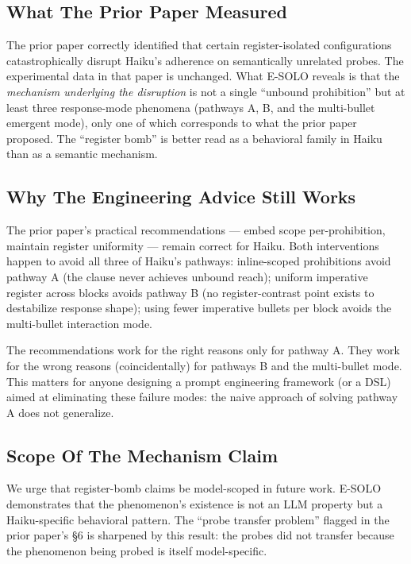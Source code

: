 \documentclass[11pt,a4paper]{article}
\begin{document}
\subsection{What The Prior Paper Measured}

The prior paper correctly identified that certain register-isolated
configurations catastrophically disrupt Haiku's adherence on
semantically unrelated probes. The experimental data in that paper
is unchanged. What E-SOLO reveals is that the \emph{mechanism
underlying the disruption} is not a single ``unbound prohibition''
but at least three response-mode phenomena (pathways A, B, and the
multi-bullet emergent mode), only one of which corresponds to what
the prior paper proposed. The ``register bomb'' is better read as
a behavioral family in Haiku than as a semantic mechanism.

\subsection{Why The Engineering Advice Still Works}

The prior paper's practical recommendations --- embed scope
per-prohibition, maintain register uniformity --- remain correct
for Haiku. Both interventions happen to avoid all three of Haiku's
pathways: inline-scoped prohibitions avoid pathway A (the clause
never achieves unbound reach); uniform imperative register across
blocks avoids pathway B (no register-contrast point exists to
destabilize response shape); using fewer imperative bullets per
block avoids the multi-bullet interaction mode.

The recommendations work for the right reasons only for pathway A.
They work for the wrong reasons (coincidentally) for pathways B and
the multi-bullet mode. This matters for anyone designing a prompt
engineering framework (or a DSL) aimed at eliminating these failure
modes: the naive approach of solving pathway A does not generalize.

\subsection{Scope Of The Mechanism Claim}

We urge that register-bomb claims be model-scoped in future work.
E-SOLO demonstrates that the phenomenon's existence is not an LLM
property but a Haiku-specific behavioral pattern. The
``probe transfer problem'' flagged in the prior paper's \S6 is
sharpened by this result: the probes did not transfer because the
phenomenon being probed is itself model-specific.
\end{document}
